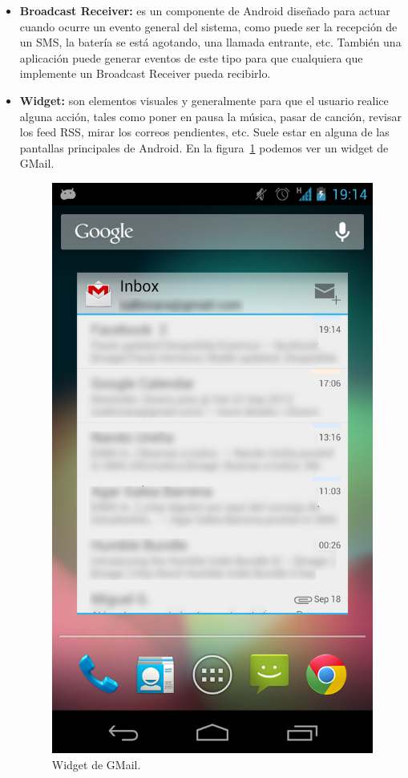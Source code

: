 \begin{itemize}
\item \textbf{Broadcast Receiver:} es un componente de Android diseñado para actuar cuando ocurre un evento general del sistema, como puede ser la recepción de un SMS, la batería se está agotando, una llamada entrante, etc. También una aplicación puede generar eventos de este tipo para que cualquiera que implemente un Broadcast Receiver pueda recibirlo.

\item \textbf{Widget:} son elementos visuales y generalmente para que el usuario realice alguna acción, tales como poner en pausa la música, pasar de canción, revisar los feed RSS, mirar los correos pendientes, etc. Suele estar en alguna de las pantallas principales de Android. En la figura~\ref{fig:widget} podemos ver un widget de GMail.
 
\begin{figure}[h]
  \centering
    \includegraphics[scale=0.2]{./Android/imagenes/widget.png}
  \caption{Widget de GMail.}
  \label{fig:widget}
\end{figure}


\end{itemize}
